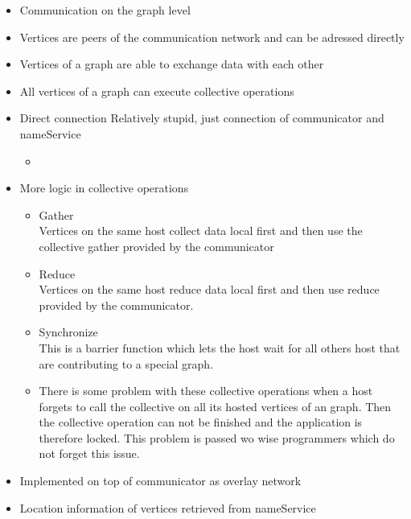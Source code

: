 \begin{itemize}
\item Communication on the graph level
\item Vertices are peers of the communication network and can be adressed directly
\item Vertices of a graph are able to exchange data with each other
\item All vertices of a graph can execute collective operations

\item Direct connection Relatively stupid, just connection of communicator and nameService
\begin{itemize}
\item 
\end{itemize}

\item More logic in collective operations
  \begin{itemize}
    \item Gather\\
      Vertices on the same host collect data local first and then use
      the collective gather provided by the communicator
    \item Reduce\\
      Vertices on the same host reduce data local first and then use
      reduce provided by the communicator.
    \item Synchronize\\
      This is a barrier function which lets the host wait for all others host
      that are contributing to a special graph. 
    \item There is some problem with these collective operations when a host
      forgets to call the collective on all its hosted vertices of an graph.
      Then the collective operation can not be finished and the application 
      is therefore locked. This problem is passed wo wise programmers which
      do not forget this issue.
  \end{itemize}
  

\item Implemented on top of communicator as overlay network
\item Location information of vertices retrieved from nameService
\end{itemize}




